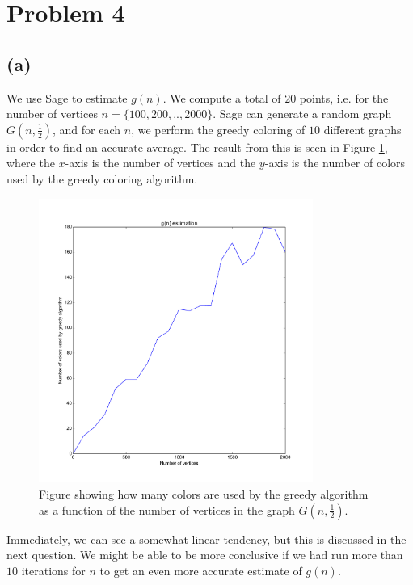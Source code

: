 \documentclass[a4paper]{article}
\begin{document}
\section{Problem 4}
\subsection{(a)}
We use Sage to estimate $g(n)$. We compute a total of $20$ points, i.e. for the number of vertices $n=\{100,200,..,2000\}$. Sage can generate a random graph $G(n, \frac{1}{2})$, and for each $n$, we perform the greedy coloring of $10$ different graphs in order to find an accurate average. The result from this is seen in Figure \ref{1}, where the $x$-axis is the number of vertices and the $y$-axis is the number of colors used by the greedy coloring algorithm.
\begin{figure}[H]
  \centering
  \captionsetup{justification=centering}
  \includegraphics[width=0.8\textwidth]{fig1.pdf}
  \caption{Figure showing how many colors are used by the greedy algorithm as a function of the number of vertices in the graph $G(n, \frac{1}{2})$.}
  \label{1}
\end{figure}
Immediately, we can see a somewhat linear tendency, but this is discussed in the next question. We might be able to be more conclusive if we had run more than $10$ iterations for $n$ to get an even more accurate estimate of $g(n)$.
\end{document}
